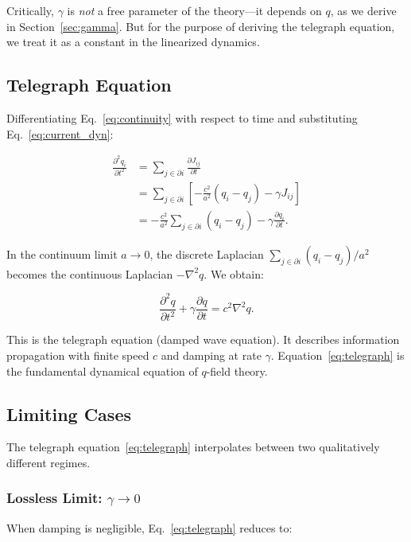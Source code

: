 \documentclass[aps,prd,twocolumn,showpacs,superscriptaddress,preprintnumbers]{revtex4-2}
\begin{document}
Critically, $\gamma$ is \emph{not} a free parameter of the theory---it depends on $q$, as we derive in Section~\ref{sec:gamma}.
But for the purpose of deriving the telegraph equation, we treat it as a constant in the linearized dynamics.

\subsection{Telegraph Equation}

Differentiating Eq.~\eqref{eq:continuity} with respect to time and substituting Eq.~\eqref{eq:current_dyn}:

\begin{align}
\frac{\partial^2 q_i}{\partial t^2} &= \sum_{j \in \partial i} \frac{\partial J_{ij}}{\partial t} \nonumber \\
&= \sum_{j \in \partial i} \left[-\frac{c^2}{a^2}(q_i - q_j) - \gamma J_{ij}\right] \nonumber \\
&= -\frac{c^2}{a^2} \sum_{j \in \partial i} (q_i - q_j) - \gamma \frac{\partial q_i}{\partial t}.
\label{eq:telegraph_step}
\end{align}

In the continuum limit $a\to0$, the discrete Laplacian $\sum_{j \in \partial i}(q_i-q_j)/a^2$ becomes the continuous Laplacian $-\nabla^2 q$.
We obtain:

\begin{equation}
\boxed{\frac{\partial^2 q}{\partial t^2} + \gamma \frac{\partial q}{\partial t} = c^2 \nabla^2 q}.
\label{eq:telegraph}
\end{equation}

This is the telegraph equation (damped wave equation).
It describes information propagation with finite speed $c$ and damping at rate $\gamma$.
Equation~\eqref{eq:telegraph} is the fundamental dynamical equation of $q$-field theory.

\subsection{Limiting Cases}

The telegraph equation~\eqref{eq:telegraph} interpolates between two qualitatively different regimes.

\subsubsection{Lossless Limit: $\gamma\to0$}

When damping is negligible, Eq.~\eqref{eq:telegraph} reduces to:
\end{document}
